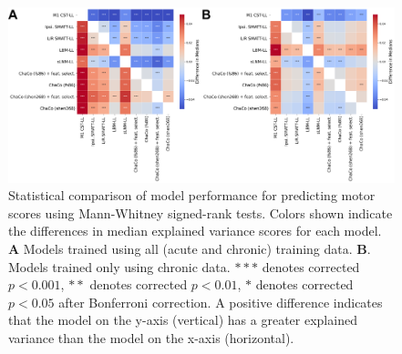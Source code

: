 \documentclass[10pt]{article}
\begin{document}
\begin{figure}[ht]
\centering
\includegraphics[width=1\linewidth]{figures/Analysis1_matrix.png}
\caption{Statistical comparison of model performance for predicting motor scores using Mann-Whitney signed-rank tests. Colors shown indicate the differences in median explained variance scores for each model. \textbf{A} Models trained using all (acute and chronic) training data. \textbf{B}. Models trained only using chronic data. $***$ denotes corrected $p < 0.001$, $**$ denotes corrected $p < 0.01$, $*$ denotes corrected $p < 0.05$ after Bonferroni correction. A positive difference indicates that the model on the y-axis (vertical) has a greater explained variance than the model on the x-axis (horizontal).
 }
\label{matrix1}
\end{figure}
\end{document}
